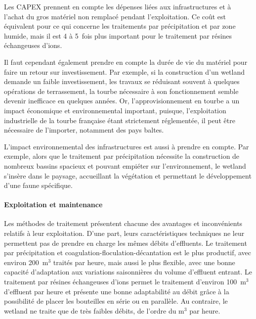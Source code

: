 \documentclass{article}
\begin{document}
Les CAPEX prennent en compte les dépenses liées aux infrastructures et à l’achat du gros matériel non remplacé pendant l’exploitation. Ce coût est équivalent pour ce qui concerne les traitements par précipitation et par zone humide, mais il est 4 à 5~fois plus important pour le traitement par résines échangeuses d’ions.

Il faut cependant également prendre en compte la durée de vie du matériel pour faire un retour sur investissement. Par exemple, si la construction d’un wetland demande un faible investissement, les travaux se réduisant souvent à quelques opérations de terrassement, la tourbe nécessaire à son fonctionnement semble devenir inefficace en quelques années. Or, l’approvisionnement en tourbe a un impact économique et environnemental important, puisque, l’exploitation industrielle de la tourbe française étant strictement réglementée, il peut être nécessaire de l’importer, notamment des pays baltes. 

L’impact environnemental des infrastructures est aussi à prendre en compte. Par exemple, alors que le traitement par précipitation nécessite la construction de nombreux bassins spacieux et pouvant empiéter sur l’environnement, le wetland s’insère dans le paysage, accueillant la végétation et permettant le développement d’une faune spécifique.

\paragraph{Exploitation et maintenance}

Les méthodes de traitement présentent chacune des avantages et inconvénients relatifs à leur exploitation. D’une part, leurs caractéristiques techniques ne leur permettent pas de prendre en charge les mêmes débits d’effluents. Le traitement par précipitation et coagulation-floculation-décantation est le plus productif, avec environ 200~$\text{m}^3$ traités par heure, mais aussi le plus flexible, avec une bonne capacité d’adaptation aux variations saisonnières du volume d’effluent entrant. 
Le traitement par résines échangeuses d’ions permet le traitement d’environ 100~$\text{m}^3$ d’effluent par heure et présente une bonne adaptabilité au débit grâce à la possibilité de placer les bouteilles en série ou en parallèle. Au contraire, le wetland ne traite que de très faibles débits, de l’ordre du $\text{m}^3$ par heure.
\end{document}
